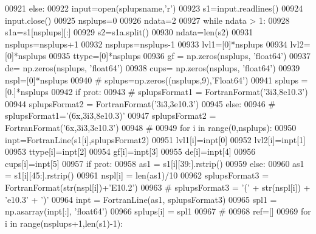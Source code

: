 \begin{DoxyCode}
00921     \textcolor{keywordflow}{else}:
00922         input=open(splupsname,\textcolor{stringliteral}{'}\textcolor{stringliteral}{r')}
00923 \textcolor{stringliteral}{        s1=input.readlines()}
00924 \textcolor{stringliteral}{        input.close()}
00925 \textcolor{stringliteral}{        nsplups=0}
00926 \textcolor{stringliteral}{        ndata=2}
00927 \textcolor{stringliteral}{        }\textcolor{keywordflow}{while} ndata > 1:
00928             s1a=s1[nsplups][:]
00929             s2=s1a.split()
00930             ndata=len(s2)
00931             nsplups=nsplups+1
00932         nsplups=nsplups-1
00933         lvl1=[0]*nsplups
00934         lvl2=[0]*nsplups
00935         ttype=[0]*nsplups
00936         gf = np.zeros(nsplups, \textcolor{stringliteral}{'float64'})
00937         de= np.zeros(nsplups, \textcolor{stringliteral}{'float64'})
00938         cups= np.zeros(nsplups, \textcolor{stringliteral}{'float64'})
00939         nspl=[0]*nsplups
00940 \textcolor{comment}{#        splups=np.zeros((nsplups,9),'Float64')}
00941         splups = [0.]*nsplups
00942         \textcolor{keywordflow}{if} prot:
00943 \textcolor{comment}{#            splupsFormat1 = FortranFormat('3i3,8e10.3')}
00944             splupsFormat2 = FortranFormat(\textcolor{stringliteral}{'3i3,3e10.3'})
00945         \textcolor{keywordflow}{else}:
00946 \textcolor{comment}{#            splupsFormat1='(6x,3i3,8e10.3)'}
00947             splupsFormat2 = FortranFormat(\textcolor{stringliteral}{'6x,3i3,3e10.3'})
00948         \textcolor{comment}{#}
00949         \textcolor{keywordflow}{for} i \textcolor{keywordflow}{in} range(0,nsplups):
00950             inpt=FortranLine(s1[i],splupsFormat2)
00951             lvl1[i]=inpt[0]
00952             lvl2[i]=inpt[1]
00953             ttype[i]=inpt[2]
00954             gf[i]=inpt[3]
00955             de[i]=inpt[4]
00956             cups[i]=inpt[5]
00957             \textcolor{keywordflow}{if} prot:
00958                 as1 = s1[i][39:].rstrip()
00959             \textcolor{keywordflow}{else}:
00960                 as1 = s1[i][45:].rstrip()
00961             nspl[i] = len(as1)/10
00962             splupsFormat3 = FortranFormat(str(nspl[i])+\textcolor{stringliteral}{'E10.2'})
00963 \textcolor{comment}{#            splupsFormat3 = '(' + str(nspl[i]) + 'e10.3' + ')'}
00964             inpt = FortranLine(as1, splupsFormat3)
00965             spl1 = np.asarray(inpt[:], \textcolor{stringliteral}{'float64'})
00966             splups[i] = spl1
00967         \textcolor{comment}{#}
00968         ref=[]
00969         \textcolor{keywordflow}{for} i \textcolor{keywordflow}{in} range(nsplups+1,len(s1)-1):

\end{DoxyCode}
